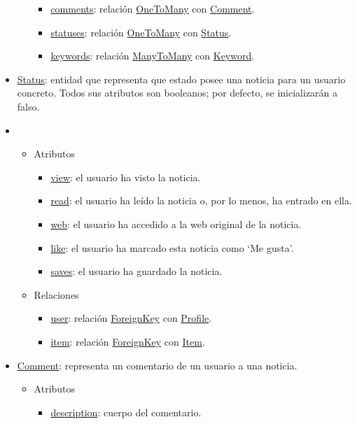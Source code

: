 \begin{itemize}
\begin{itemize}
\begin{itemize}
            \item \underline{comments}: relación \underline{OneToMany} con \underline{Comment}.
            \item \underline{statuses}: relación \underline{OneToMany} con \underline{Status}.
            \item \underline{keywords}: relación \underline{ManyToMany} con \underline{Keyword}.
        \end{itemize}
    \end{itemize}
    \item \underline{Status}: entidad que representa que estado posee una noticia para un usuario concreto. Todos sus atributos son booleanos; por defecto, se inicializarán a falso.
    \item \begin{itemize}
        \item Atributos
        \begin{itemize}
            \item \underline{view}: el usuario ha visto la noticia.
            \item \underline{read}: el usuario ha leído la noticia o, por lo menos, ha entrado en ella.
            \item \underline{web}: el usuario ha accedido a la web original de la noticia.
            \item \underline{like}: el usuario ha marcado esta noticia como ‘Me gusta’.
            \item \underline{saves}: el usuario ha guardado la noticia.
        \end{itemize}
        \item Relaciones
        \begin{itemize}
            \item \underline{user}: relación \underline{ForeignKey} con \underline{Profile}.
            \item \underline{item}: relación \underline{ForeignKey} con \underline{Item}.
        \end{itemize}
    \end{itemize}
    \item \underline{Comment}: representa un comentario de un usuario a una noticia.
    \begin{itemize}
        \item Atributos
        \begin{itemize}
            \item \underline{description}: cuerpo del comentario.

\end{itemize}
\end{itemize}
\end{itemize}

